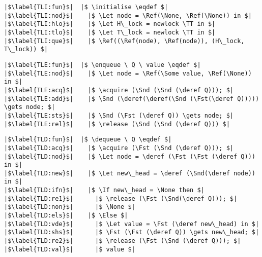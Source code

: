 \documentclass[a4paper, 11pt]{report}
\newcommand{\acquire}{\operatorname{acquire}}
\newcommand{\release}{\operatorname{release}}
\newcommand{\initialise}{\operatorname{initialize}}
\newcommand{\enqueue}{\operatorname{enqueue}}
\newcommand{\dequeue}{\operatorname{dequeue}}
\begin{document}
\begin{verbatim}
|$\label{TLI:fun}$|  |$ \initialise \eqdef $|
|$\label{TLI:nod}$|    |$ \Let node = \Ref(\None, \Ref(\None)) in $|
|$\label{TLI:hlo}$|    |$ \Let H\_lock = newlock \TT in $|
|$\label{TLI:tlo}$|    |$ \Let T\_lock = newlock \TT in $|
|$\label{TLI:que}$|    |$ \Ref((\Ref(node), \Ref(node)), (H\_lock, T\_lock)) $|
\end{verbatim}

\begin{verbatim}
|$\label{TLE:fun}$|  |$ \enqueue \ Q \ value \eqdef $|
|$\label{TLE:nod}$|    |$ \Let node = \Ref(\Some value, \Ref(\None)) in $|
|$\label{TLE:acq}$|    |$ \acquire (\Snd (\Snd (\deref Q))); $|
|$\label{TLE:add}$|    |$ \Snd (\deref(\deref(\Snd (\Fst(\deref Q))))) \gets node; $|
|$\label{TLE:sts}$|    |$ \Snd (\Fst (\deref Q)) \gets node; $|
|$\label{TLE:rel}$|    |$ \release (\Snd (\Snd (\deref Q))) $|
\end{verbatim}

\begin{verbatim}
|$\label{TLD:fun}$|  |$ \dequeue \ Q \eqdef $|
|$\label{TLD:acq}$|    |$ \acquire (\Fst (\Snd (\deref Q))); $|
|$\label{TLD:nod}$|    |$ \Let node = \deref (\Fst (\Fst (\deref Q))) in $|
|$\label{TLD:new}$|    |$ \Let new\_head = \deref (\Snd(\deref node)) in $|
|$\label{TLD:ifn}$|    |$ \If new\_head = \None then $|
|$\label{TLD:re1}$|      |$ \release (\Fst (\Snd(\deref Q))); $|
|$\label{TLD:non}$|      |$ \None $|
|$\label{TLD:els}$|    |$ \Else $|
|$\label{TLD:vde}$|      |$ \Let value = \Fst (\deref new\_head) in $|
|$\label{TLD:shs}$|      |$ \Fst (\Fst (\deref Q)) \gets new\_head; $|
|$\label{TLD:re2}$|      |$ \release (\Fst (\Snd (\deref Q))); $|
|$\label{TLD:val}$|      |$ value $|
\end{verbatim}

\end{document}
